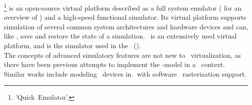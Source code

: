 \noindent
\termqemu \footnote{'Quick~Emulator'.} is an open-source virtual platform described as a full system emulator ( for an overview of \termqemu ) and a high-speed functional simulator.
Its virtual platform supports simulation of several common system architectures and hardware devices and can, like \termsimics , save and restore the state of a simulation.
\termqemu\ is an extensively used virtual platform, and is the simulator used in the \termrefsolu\ ().\\

\noindent
The concepts of advanced simulatory features are not new to \termgpu\ virtualization, as there have been previous attempts to implement the \termcheckpointrestart -model in a \termgpu\ context.
Similar works include modeling \termgpu\ devices in \termqemu\ with software \termopengles\ rasterization support.


